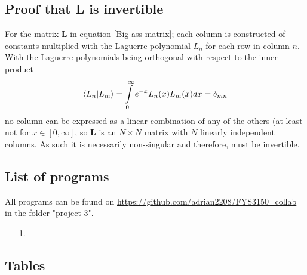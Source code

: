 \documentclass[10pt,a4paper]{article}
\begin{document}
\subsection{Proof that \textbf{L} is invertible}\label{Proof that big ass matrix is invertible}
For the matrix $\textbf{L}$ in equation \ref{Big ass matrix}; each column is constructed of constants multiplied with the Laguerre polynomial $L_n$ for each row in column $n$. With the Laguerre polynomials being orthogonal with respect to the inner product
\begin{equation}
\braket{L_n|L_m} = \int\limits_0^\infty e^{-x} L_n(x) L_m(x) dx = \delta_{mn}
\end{equation}
no column can be expressed as a linear combination of any of the others (at least not for $x \in [0,\infty]$, so \textbf{L} is an $N\times N$ matrix with $N$ linearly independent columns. As such it is necessarily non-singular and therefore, must be invertible.
\subsection{List of programs}
All programs can be found on \url{https://github.com/adrian2208/FYS3150_collab} in the folder "project 3".
\begin{itemize}
\item[1.] 
\end{itemize}

\subsection{Tables}

\cite{Lecture_Notes_Fall_2015}
\cite{Problem_set_3}








\begin{comment}

$$
\begin{bmatrix}
0 & 0 & 0 & 0 \\
0 & 0 & 0 & 0 \\
0 & 0 & 0 & 0 \\
0 & 0 & 0 & 0 \\
\end{bmatrix}
$$

\begin{lstlisting}[caption=insert caption]
for (unsigned int i = 0; i<100;i++{
}
\end{lstlisting}

\begin{figure}[h]
\texttt{[image: ]}
\caption{include caption}
\end{figure}

\end{comment}
\end{document}
